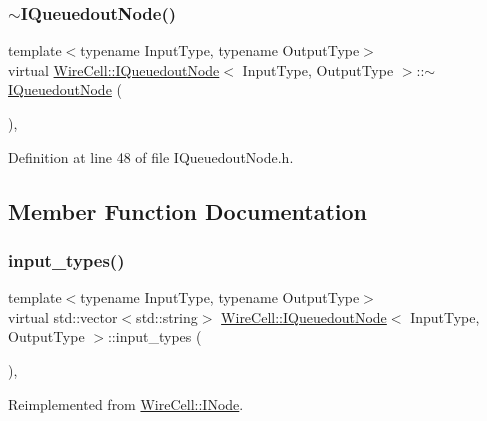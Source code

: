 \subsubsection{\texorpdfstring{$\sim$\+I\+Queuedout\+Node()}{~IQueuedoutNode()}}
{\footnotesize\ttfamily template$<$typename Input\+Type, typename Output\+Type$>$ \\
virtual \hyperlink{class_wire_cell_1_1_i_queuedout_node}{Wire\+Cell\+::\+I\+Queuedout\+Node}$<$ Input\+Type, Output\+Type $>$\+::$\sim$\hyperlink{class_wire_cell_1_1_i_queuedout_node}{I\+Queuedout\+Node} (\begin{DoxyParamCaption}{ }\end{DoxyParamCaption})\hspace{0.3cm}{\ttfamily [inline]}, {\ttfamily [virtual]}}



Definition at line 48 of file I\+Queuedout\+Node.\+h.



\subsection{Member Function Documentation}
\mbox{\label{class_wire_cell_1_1_i_queuedout_node_a5289285ab7c2f8117e9aff75dcbb8077}} 
\subsubsection{\texorpdfstring{input\+\_\+types()}{input\_types()}}
{\footnotesize\ttfamily template$<$typename Input\+Type, typename Output\+Type$>$ \\
virtual std\+::vector$<$std\+::string$>$ \hyperlink{class_wire_cell_1_1_i_queuedout_node}{Wire\+Cell\+::\+I\+Queuedout\+Node}$<$ Input\+Type, Output\+Type $>$\+::input\+\_\+types (\begin{DoxyParamCaption}{ }\end{DoxyParamCaption})\hspace{0.3cm}{\ttfamily [inline]}, {\ttfamily [virtual]}}



Reimplemented from \hyperlink{class_wire_cell_1_1_i_node_ae13fc140c8e815fac9327dfa5b43f853}{Wire\+Cell\+::\+I\+Node}.



